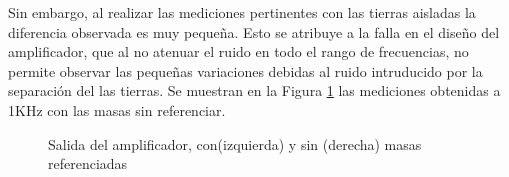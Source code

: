 Sin embargo, al realizar las mediciones pertinentes con las tierras aisladas la diferencia observada es muy peque\~na.
Esto se atribuye a la falla en el dise\~no del amplificador, que al no atenuar el ruido en todo el rango de frecuencias, no permite observar las peque\~nas variaciones debidas al ruido intruducido por la separaci\'on del las tierras.
Se muestran en la Figura \ref{fig:GND_notConnected} las mediciones obtenidas a 1KHz con las masas sin referenciar.

\begin{figure}[H]
    \centering
{}
\caption{Salida del amplificador, con(izquierda) y sin (derecha) masas referenciadas}
\label{fig:GND_notConnected}
\end{figure}
